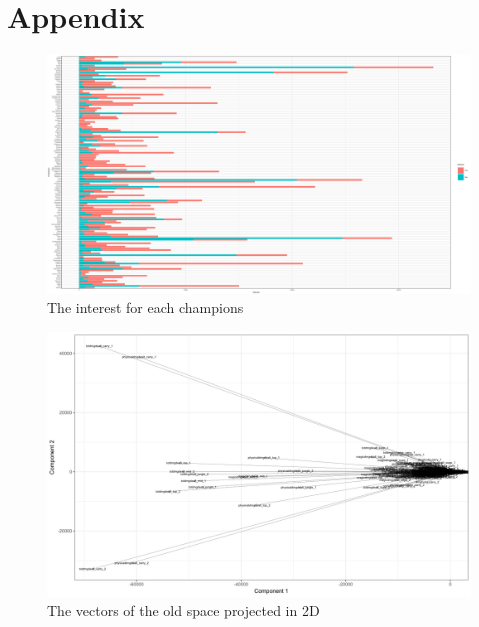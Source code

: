 \documentclass{article}
\begin{document}
\section{Appendix}
\begin{figure}
    \includegraphics[scale=0.35]{freq.png}
    \caption{The interest for each champions}
    \label{fig:freq}
\end{figure}

\begin{figure}
    \includegraphics[scale=0.45]{vectors.png}
    \caption{The vectors of the old space projected in 2D}
    \label{fig:vectors}
\end{figure}
\end{document}
